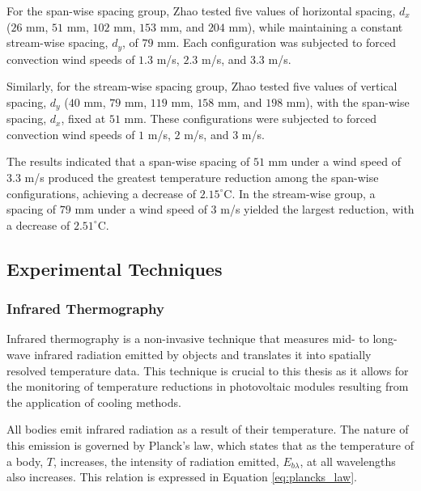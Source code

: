 For the span-wise spacing group, Zhao tested five values of horizontal spacing, $d_x$ ($26$ mm, $51$ mm, $102$ mm, $153$ mm, and $204$ mm), while maintaining a constant stream-wise spacing, $d_y$, of $79$ mm. Each configuration was subjected to forced convection wind speeds of $1.3$ m/s, $2.3$ m/s, and $3.3$ m/s.\vspace{0.5em}

Similarly, for the stream-wise spacing group, Zhao tested five values of vertical spacing, $d_y$ ($40$ mm, $79$ mm, $119$ mm, $158$ mm, and $198$ mm), with the span-wise spacing, $d_x$, fixed at $51$ mm. These configurations were subjected to forced convection wind speeds of $1$ m/s, $2$ m/s, and $3$ m/s.\vspace{0.5em}

The results indicated that a span-wise spacing of $51$ mm under a wind speed of $3.3$ m/s produced the greatest temperature reduction among the span-wise configurations, achieving a decrease of $2.15^\circ\text{C}$. In the stream-wise group, a spacing of $79$ mm under a wind speed of $3$ m/s yielded the largest reduction, with a decrease of $2.51^\circ\text{C}$. \cite{Zhou2024SpacingConvection} \vspace{0.5em}

\pagebreak
\subsection{Experimental Techniques}
\subsubsection{Infrared Thermography}
Infrared thermography is a non-invasive technique that measures mid- to long-wave infrared radiation emitted by objects and translates it into spatially resolved temperature data. \cite{Tattersall2016InfraredPhysiology} This technique is crucial to this thesis as it allows for the monitoring of temperature reductions in photovoltaic modules resulting from the application of cooling methods.\vspace{0.5em}

All bodies emit infrared radiation as a result of their temperature. The nature of this emission is governed by Planck’s law, which states that as the temperature of a body, \( T \), increases, the intensity of radiation emitted, \( E_{b\lambda} \), at all wavelengths also increases. This relation is expressed in Equation \ref{eq:plancks_law}. \cite{Cengel2014FundamentalsRadiation}

